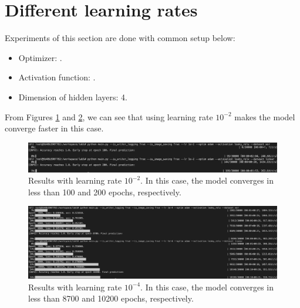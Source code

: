 \section{Different learning rates}
\indent
	Experiments of this section are done with common setup below: 
	\begin{itemize}
		\item Optimizer: .
		\item Activation function: .
		\item Dimension of hidden layers: 4.
	\end{itemize}

	From Figures \ref{result-lr-1e-2} and \ref{result-lr-1e-4}, we can see that 
	using learning rate $10^{-2}$ makes the model converge faster in this case.
	
	\begin{figure}[H]
		\centering
		\includegraphics[scale=0.3]{img/adam_1e-2_leaky-relu.png}
		\caption{Results with learning rate $10^{-2}$. In this case, the model converges in less than 100 and 200 epochs, respectively.}
		\label{result-lr-1e-2}
	\end{figure}
	\begin{figure}[H]
		\centering
		\includegraphics[scale=0.3]{img/adam_1e-4_leaky-relu.png}
		\caption{Results with learning rate $10^{-4}$. In this case, the model converges in less than 8700 and 10200 epochs, respectively.}
		\label{result-lr-1e-4}
	\end{figure}

